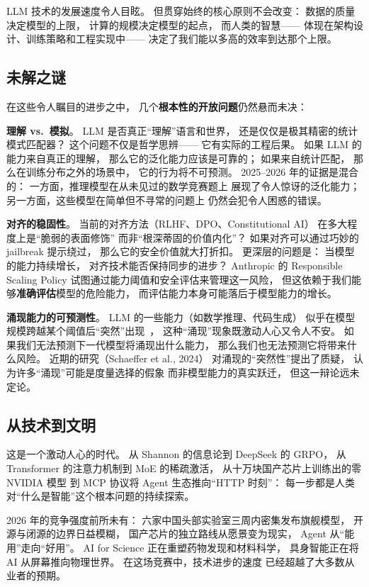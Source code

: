 LLM 技术的发展速度令人目眩。
但贯穿始终的核心原则不会改变：
数据的质量决定模型的上限，
计算的规模决定模型的起点，
而人类的智慧——
体现在架构设计、训练策略和工程实现中——
决定了我们能以多高的效率到达那个上限。

\subsection{未解之谜}

在这些令人瞩目的进步之中，
几个\textbf{根本性的开放问题}仍然悬而未决：

\textbf{理解 vs.\ 模拟}。
LLM 是否真正“理解”语言和世界，
还是仅仅是极其精密的统计模式匹配器？
这个问题不仅是哲学思辨——
它有实际的工程后果。
如果 LLM 的能力来自真正的理解，
那么它的泛化能力应该是可靠的；
如果来自统计匹配，
那么在训练分布之外的场景中，
它的行为将不可预测。
2025--2026 年的证据是混合的：
一方面，推理模型在从未见过的数学竞赛题上
展现了令人惊讶的泛化能力；
另一方面，这些模型在简单但不寻常的问题上
仍然会犯令人困惑的错误。

\textbf{对齐的稳固性}。
当前的对齐方法（RLHF、DPO、Constitutional AI）
在多大程度上是“脆弱的表面修饰”
而非“根深蒂固的价值内化”？
如果对齐可以通过巧妙的 jailbreak 提示绕过，
那么它的安全价值就大打折扣。
更深层的问题是：
当模型的能力持续增长，
对齐技术能否保持同步的进步？
Anthropic 的 Responsible Scaling Policy
试图通过能力阈值和安全评估来管理这一风险，
但这依赖于我们能够\textbf{准确评估}模型的危险能力，
而评估能力本身可能落后于模型能力的增长。

\textbf{涌现能力的可预测性}。
LLM 的一些能力（如数学推理、代码生成）
似乎在模型规模跨越某个阈值后“突然”出现~\cite{wei2022emergent}，
这种“涌现”现象既激动人心又令人不安。
如果我们无法预测下一代模型将涌现出什么能力，
那么我们也无法预测它将带来什么风险。
近期的研究（Schaeffer et al., 2024）
对涌现的“突然性”提出了质疑，
认为许多“涌现”可能是度量选择的假象
而非模型能力的真实跃迁，
但这一辩论远未定论。

\subsection{从技术到文明}

这是一个激动人心的时代。
从 Shannon 的信息论到 DeepSeek 的 GRPO，
从 Transformer 的注意力机制到 MoE 的稀疏激活，
从十万块国产芯片上训练出的零 NVIDIA 模型
到 MCP 协议将 Agent 生态推向“HTTP 时刻”：
每一步都是人类对“什么是智能”这个根本问题的持续探索。

2026 年的竞争强度前所未有：
六家中国头部实验室三周内密集发布旗舰模型，
开源与闭源的边界日益模糊，
国产芯片的独立路线从愿景变为现实，
Agent 从“能用”走向“好用”。
AI for Science 正在重塑药物发现和材料科学，
具身智能正在将 AI 从屏幕推向物理世界。
在这场竞赛中，技术进步的速度
已经超越了大多数从业者的预期。


